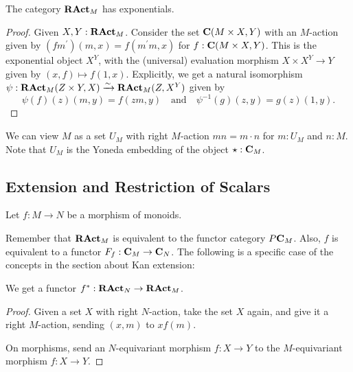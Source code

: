 \begin{lemma}
  The category $ \mathbf{RAct}_{M} $ has exponentials.
\end{lemma}
\begin{proof}
  Given $ X, Y : \mathbf{RAct}_{M} $. Consider the set $ \mathbf{C}(M \times X, Y) $ with an $ M $-action given by $ (f m^\prime)(m, x) = f(m^\prime m, x) $ for $ f : \mathbf{C}(M \times X, Y) $. This is the exponential object $ X^Y $, with the (universal) evaluation morphism $ X \times X^Y \to Y $ given by $ (x, f) \mapsto f(1, x) $. Explicitly, we get a natural isomorphism $ \psi: \mathbf{RAct}_{M}(Z \times Y, X) \xrightarrow \sim \mathbf{RAct}_{M}(Z, X^Y) $ given by
  \[ \psi(f)(z)(m, y) = f(z m, y) \quad \text{and} \quad \psi^{-1}(g)(z, y) = g(z)(1, y). \]
\end{proof}

\begin{definition}
  We can view $ M $ as a set $ U_M $ with right $ M $-action $ m n = m \cdot n $ for $ m: U_M $ and $ n: M $. Note that $ U_M $ is the Yoneda embedding of the object $ \star : \mathbf{C}_M $.
\end{definition}

\subsection{Extension and Restriction of Scalars}

Let $ f: M \to N $ be a morphism of monoids.

Remember that $ \mathbf{RAct}_{M} $ is equivalent to the functor category $ P \mathbf{C}_M $. Also, $ f $ is equivalent to a functor $ F_f : \mathbf{C}_M \to \mathbf{C}_N $. The following is a specific case of the concepts in the section about Kan extension:

\begin{lemma}
  We get a  functor $ f^* : \mathbf{RAct}_{N} \to \mathbf{RAct}_{M} $.
\end{lemma}
\begin{proof}
  Given a set $ X $ with right $ N $-action, take the set $ X $ again, and give it a right $ M $-action, sending $ (x, m) $ to $ x f(m) $.

  On morphisms, send an $ N $-equivariant morphism $ f: X \to Y $ to the $ M $-equivariant morphism $ f: X \to Y $.
\end{proof}

